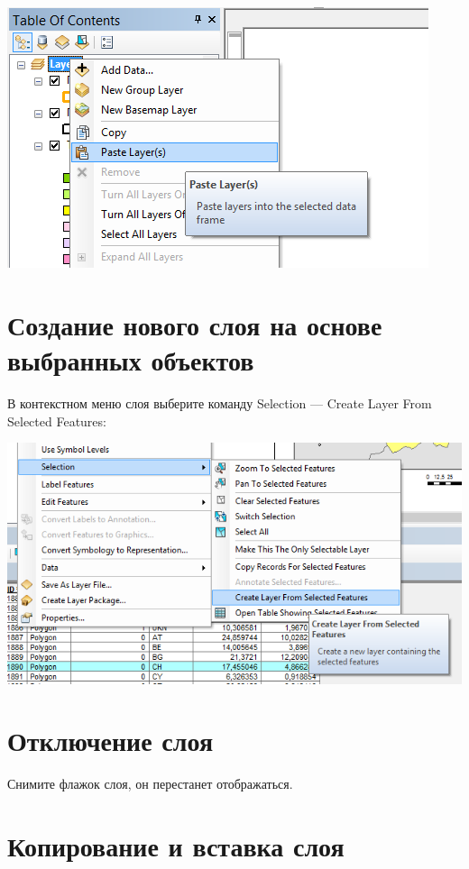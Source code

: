 \documentclass[]{book}
\theoremstyle{definition}
\theoremstyle{definition}
\theoremstyle{definition}
\theoremstyle{remark}
\begin{document}
\includegraphics{images/Appendix/image12.png}

\hypertarget{------}{%
\section{Создание нового слоя на основе выбранных
объектов}\label{------}}

В контекстном меню слоя выберите команду Selection --- Create Layer From
Selected Features:

\includegraphics{images/Appendix/image13.png}

\hypertarget{-}{%
\section{Отключение слоя}\label{-}}

Снимите флажок слоя, он перестанет отображаться.

\hypertarget{---}{%
\section{Копирование и вставка слоя}\label{---}}
\end{document}

